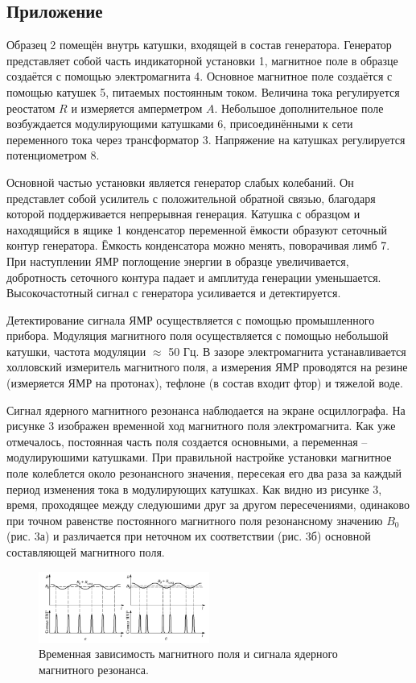 \subsection*{Приложение}


Образец 2 помещён внутрь катушки, входящей в состав генератора. Генератор представляет собой часть индикаторной установки 1, магнитное поле в образце создаётся с помощью электромагнита 4. Основное магнитное поле создаётся с помощью катушек 5, питаемых постоянным током. Величина тока регулируется реостатом $R$ и измеряется амперметром $A$. Небольшое дополнительное поле возбуждается модулирующими катушками 6, присоединёнными к сети переменного тока через трансформатор 3. Напряжение на катушках регулируется потенциометром 8.


Основной частью установки является генератор слабых колебаний. Он представлет собой усилитель с положительной обратной связью, благодаря которой поддерживается непрерывная генерация. Катушка с образцом и находящийся в ящике 1 конденсатор переменной ёмкости образуют сеточный контур генератора. Ёмкость конденсатора можно менять, поворачивая лимб 7. При наступлении ЯМР поглощение энергии в образце увеличивается, добротность сеточного контура падает и амплитуда генерации уменьшается. Высокочастотный сигнал с генератора усиливается и детектируется.


Детектирование сигнала ЯМР осуществляется с помощью промышленного прибора. Модуляция магнитного поля осуществляется с помощью небольшой катушки, частота модуляции $\approx$ 50 Гц. В зазоре электромагнита устанавливается холловский измеритель магнитного поля, а измерения ЯМР проводятся на резине (измеряется ЯМР на протонах), тефлоне (в состав входит фтор) и тяжелой воде.


Сигнал ядерного магнитного резонанса наблюдается на экране осциллографа. На рисунке 3  изображен временной ход магнитного поля электромагнита. Как уже отмечалось, постоянная часть поля создается основными, а переменная -- модулируюшими катушками. При правильной настройке установки магнитное поле колеблется около резонансного значения, пересекая его два раза за каждый период изменения тока в модулирующих катушках. Как видно из рисунке 3, время, проходящее между следуюшими друг за другом пересечениями, одинаково при точном равенстве постоянного магнитного поля резонансному значению $B_{0}$ (рис. 3а) и различается при неточном их соответствии (рис. 3б) основной составляющей магнитного поля.


\begin{figure}[h]
    \centering
    \includegraphics[width=0.5\textwidth]{ft.png}
    \caption{Временная зависимость магнитного поля и сигнала ядерного магнитного резонанса.}
\end{figure}
